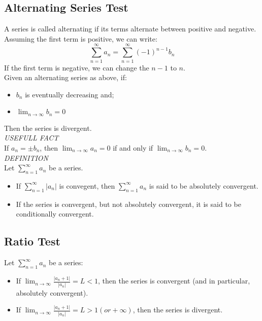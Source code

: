 \documentclass[12pt, letterpaper]{article}
\begin{document}
        \subsection{Alternating Series Test}
            A series is called alternating if its terms alternate between positive and negative. Assuming the first term is positive, we can write:
            \begin{equation*}
                \sum^{\infty}_{n = 1} a_n = \sum^{\infty}_{n = 1} (-1)^{n-1} b_n
            \end{equation*}
            If the first term is negative, we can change the $n-1$ to $n$.\\
            Given an alternating series as above, if:
            \begin{center}
                \begin{itemize}
                    \item $b_n$ is eventually decreasing and;
                    \item $\lim_{n \to \infty} b_n = 0$
                \end{itemize}
            \end{center}
            Then the series is divergent.\\
            \textit{USEFULL FACT}\\
            If $a_n = \pm b_n$, then $\lim_{n \to \infty} a_n = 0$ if and only if $\lim_{n \to \infty} b_n = 0$.\\
            \textit{DEFINITION}\\
            Let $\sum^{\infty}_{n = 1} a_n$ be a series. 
            \begin{center}
                \begin{itemize}
                    \item If $\sum^{\infty}_{n = 1} |a_n|$ is convegent, then $\sum^{\infty}_{n = 1} a_n$ is said to be absolutely convergent. 
                    \item If the series is convergent, but not absolutely convergent, it is said to be conditionally convergent.
                \end{itemize}
            \end{center}

        \subsection{Ratio Test}
            Let $\sum_{n = 1}^\infty a_n$ be a series:
            \begin{itemize}
                \item If $\lim_{n \to \infty} \frac{ |a_n + 1| }{ |a_n| } = L < 1$, then the series is convergent (and in particular, absolutely convergent).
                \item If $\lim_{n \to \infty} \frac{ |a_n + 1| }{ |a_n| } = L > 1 (or +\infty)$, then the series is divergent.
            \end{itemize}
            
\end{document}
